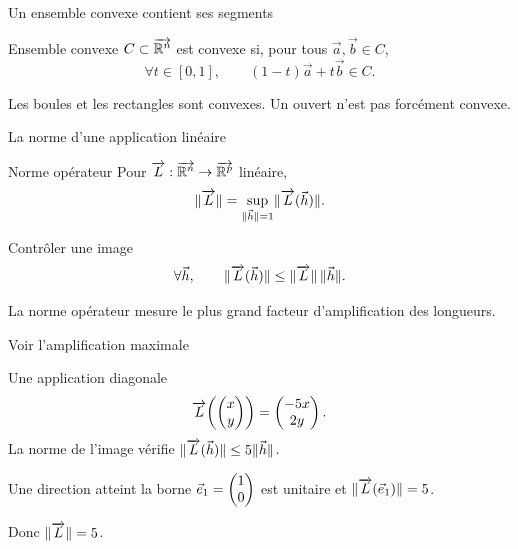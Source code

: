 \begin{frame}[t]{Un ensemble convexe contient ses segments}
\coursanalyse
\begin{notion}{Ensemble convexe}
$C\subset\overrightarrow{\mathbb R^{n}}$ est convexe si, pour tous $\vec a,\vec b\in C$,
\[\forall t\in[0,1],\qquad(1-t)\vec a+t\vec b\in C.\]
\end{notion}
\begin{center}\end{center}
\vfill Les boules et les rectangles sont convexes. Un ouvert n'est pas forcément convexe.
\end{frame}

\begin{frame}[t]{La norme d’une application linéaire}
\coursanalyse
\begin{notion}{Norme opérateur}
Pour $\overrightarrow{L}:\overrightarrow{\mathbb R^{n}}\to\overrightarrow{\mathbb R^{p}}$ linéaire,
\[\lVert \overrightarrow{L}\rVert=\sup_{\lVert \vec h\rVert=1}\lVert \overrightarrow{L}(\vec h)\rVert.\]
\end{notion}
\begin{theoreme}{Contrôler une image}
\[\forall\vec h,\qquad\lVert \overrightarrow{L}(\vec h)\rVert\le\lVert \overrightarrow{L}\rVert\,\lVert \vec h\rVert.\]
\end{theoreme}
\vfill La norme opérateur mesure le plus grand facteur d'amplification des longueurs.
\end{frame}

\begin{frame}[t]{Voir l’amplification maximale}
\coursanalyse
\begin{exemple}{Une application diagonale}
\[\overrightarrow{L}\!\left(\begin{pmatrix}x\\y\end{pmatrix}\right)=\begin{pmatrix}-5x\\2y\end{pmatrix}.\]
La norme de l'image vérifie $\lVert \overrightarrow{L}(\vec h)\rVert\le5\lVert \vec h\rVert$.
\end{exemple}
\begin{resultat}{Une direction atteint la borne}
$\vec e_1=\begin{pmatrix}1\\0\end{pmatrix}$ est unitaire et $\lVert \overrightarrow{L}(\vec e_1)\rVert=5$.

\medskip
Donc $\lVert \overrightarrow{L}\rVert=5$.
\end{resultat}
\end{frame}

